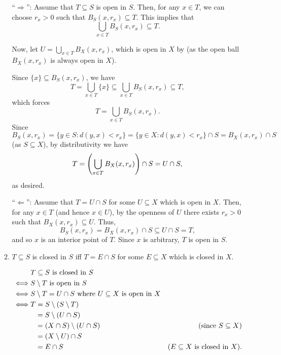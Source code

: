 \begin{enumerate}
\begin{enumerate}
\begin{pf}
``\(\Rightarrow\)'': Assume that \(T\subseteq S\) is open in \(S\). Then, for
any \(x\in T\), we can choose \(r_x>0\) such that \(B_S(x,r_x)\subseteq T\).
This implies that
\[
\bigcup_{x\in T}B_S(x, r_x)\subseteq T.
\]

Now, let \(\displaystyle U=\bigcup_{x\in T}B_X(x,r_x)\), which is open
in \(X\) by  (as the open ball
\(B_X(x,r_x)\) is always open in \(X\)).

Since \(\{x\}\subseteq B_S(x,r_x)\), we have
\[
T=\bigcup_{x\in T}\{x\}\subseteq \bigcup_{x\in T}B_S(x, r_x)\subseteq T,
\]
which forces
\[
T=\bigcup_{x\in T}B_S(x, r_x).
\]
Since \(B_S(x,r_x)=\{y\in S:d(y,x)<r_x\}=\{y\in X:d(y,x)<r_x\}\cap
S=B_X(x,r_x)\cap S\) (as \(S\subseteq X\)), by distributivity we have
\[
T=\qty(\bigcup_{x\in T}B_X(x,r_x))\cap S=U\cap S,
\]
as desired.

``\(\Leftarrow\)'': Assume that \(T=U\cap S\) for some \(U\subseteq X\) which
is open in \(X\). Then, for any \(x\in T\) (and hence \(x\in U\)), by the
openness of \(U\) there exists \(r_x>0\) such that \(B_X(x,r_x)\subseteq U\).
Thus,
\[
B_S(x,r_x)=B_X(x,r_x)\cap S\subseteq U\cap S=T,
\]
and so \(x\) is an interior point of \(T\). Since \(x\) is arbitrary, \(T\) is
open in \(S\).
\end{pf}
\item \(T\subseteq S\) is closed in \(S\) iff \(T=E\cap S\) for some
\(E\subseteq X\) which is closed in \(X\).

\begin{pf}
\begin{align*}
&\text{\(T\subseteq S\) is closed in \(S\)}\\
\iff &\text{\(S\setminus T\) is open in \(S\)}\\
\iff &\text{\(S\setminus T=U\cap S\) where \(U\subseteq X\) is open in \(X\)}\\
\iff &T=S\setminus(S\setminus T)\\
&\hspace{0.25cm}=S\setminus(U\cap S)\\
&\hspace{0.25cm}=(X\cap S)\setminus(U\cap S)&\text{(since \(S\subseteq X\))}\\
&\hspace{0.25cm}=(X\setminus U)\cap S\\
&\hspace{0.25cm}=E\cap S&\text{(\(E\subseteq X\) is closed in \(X\))}.
\end{align*}
\end{pf}
\end{enumerate}


\end{enumerate}
